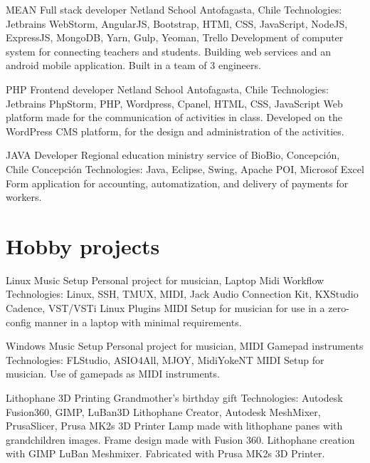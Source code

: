\documentclass[draft,color,12pt,letterpaper,sans]{moderncv}
\begin{document}
{MEAN Full stack developer}
{Netland School}
{Antofagasta, Chile}
{\newline Technologies: Jetbrains WebStorm, AngularJS, Bootstrap, HTMl, CSS, JavaScript, NodeJS, ExpressJS, MongoDB, Yarn, Gulp, Yeoman, Trello}
{Development of computer system for connecting teachers and students. Building web services and an android mobile application. Built in a team of 3 engineers.\newline}

{PHP Frontend developer}
{Netland School}
{Antofagasta, Chile}
{\newline Technologies: Jetbrains PhpStorm, PHP, Wordpress, Cpanel, HTML, CSS, JavaScript}
{Web platform made for the communication of activities in class. Developed on the WordPress CMS platform, for the design and administration of the activities.\newline}

{JAVA Developer}
{Regional education ministry service of BioBio, Concepci\'on, Chile}
{Concepci\'on}
{\newline Technologies: Java, Eclipse, Swing, Apache POI, Microsof Excel}
{Form application for accounting, automatization, and delivery of payments for workers.\newline}

\newpage

\section{Hobby projects}

\cventry {}
{Linux Music Setup}
{Personal project for musician, Laptop Midi Workflow}
{}
{\newline Technologies: Linux, SSH, TMUX, MIDI, Jack Audio Connection Kit, KXStudio Cadence, VST/VSTi Linux Plugins}
{MIDI Setup for musician for use in a zero-config manner in a laptop with minimal requirements.\newline}

\cventry {}
{Windows Music Setup}
{Personal project for musician, MIDI Gamepad instruments}
{}
{\newline Technologies: FLStudio, ASIO4All, MJOY, MidiYokeNT}
{MIDI Setup for musician. Use of gamepads as MIDI instruments.\newline}


\cventry {}
{Lithophane 3D Printing}
{Grandmother's birthday gift}
{}
{\newline Technologies: Autodesk Fusion360, GIMP, LuBan3D Lithophane Creator, Autodesk MeshMixer, PrusaSlicer, Prusa MK2s 3D Printer}
{Lamp made with lithophane panes with grandchildren images. Frame design made with Fusion 360. Lithophane creation with GIMP \faArrowRight LuBan \faArrowRight Meshmixer. Fabricated with Prusa MK2s 3D Printer. \newline}
\end{document}
